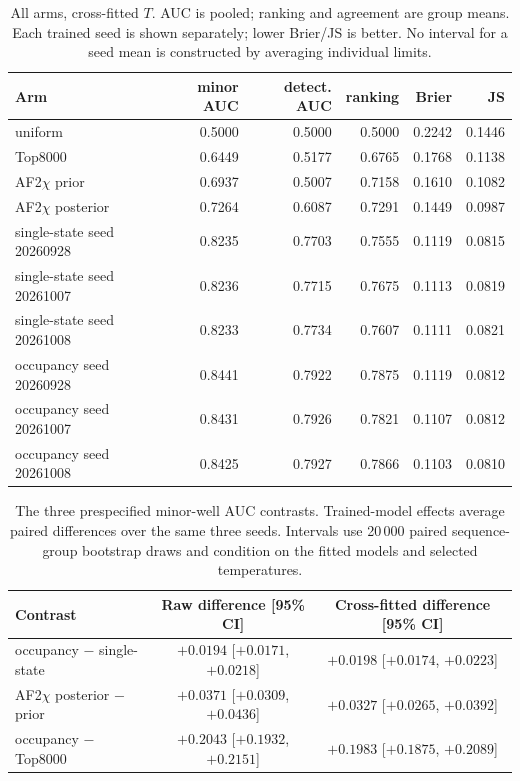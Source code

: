 \documentclass[10pt,a4paper]{article}
\begin{document}
\begin{table}[!htbp]
\centering
\caption{All arms, cross-fitted $T$. AUC is pooled; ranking and agreement are group means. Each trained seed is shown separately; lower Brier/JS is better. No interval for a seed mean is constructed by averaging individual limits.}
\label{tab:afarmscal}
\small\setlength{\tabcolsep}{4pt}
\begin{tabular}{@{}lrrrrr@{}}
\toprule
Arm & minor AUC & detect. AUC & ranking & Brier & JS \\
\midrule
uniform & 0.5000 & 0.5000 & 0.5000 & 0.2242 & 0.1446 \\
Top8000 & 0.6449 & 0.5177 & 0.6765 & 0.1768 & 0.1138 \\
AF2$\chi$ prior & 0.6937 & 0.5007 & 0.7158 & 0.1610 & 0.1082 \\
AF2$\chi$ posterior & 0.7264 & 0.6087 & 0.7291 & 0.1449 & 0.0987 \\
single-state seed 20260928 & 0.8235 & 0.7703 & 0.7555 & 0.1119 & 0.0815 \\
single-state seed 20261007 & 0.8236 & 0.7715 & 0.7675 & 0.1113 & 0.0819 \\
single-state seed 20261008 & 0.8233 & 0.7734 & 0.7607 & 0.1111 & 0.0821 \\
occupancy seed 20260928 & 0.8441 & 0.7922 & 0.7875 & 0.1119 & 0.0812 \\
occupancy seed 20261007 & 0.8431 & 0.7926 & 0.7821 & 0.1107 & 0.0812 \\
occupancy seed 20261008 & 0.8425 & 0.7927 & 0.7866 & 0.1103 & 0.0810 \\
\bottomrule
\end{tabular}
\end{table}

\begin{table}[!htbp]
\centering
\caption{The three prespecified minor-well AUC contrasts. Trained-model effects average paired differences over the same three seeds. Intervals use 20\,000 paired sequence-group bootstrap draws and condition on the fitted models and selected temperatures.}
\label{tab:afprimary}
\small\setlength{\tabcolsep}{4pt}
\begin{tabular}{@{}lcc@{}}
\toprule
Contrast & Raw difference [95\% CI] & Cross-fitted difference [95\% CI] \\
\midrule
occupancy $-$ single-state & $+0.0194$ [$+0.0171$, $+0.0218$] & $+0.0198$ [$+0.0174$, $+0.0223$] \\
AF2$\chi$ posterior $-$ prior & $+0.0371$ [$+0.0309$, $+0.0436$] & $+0.0327$ [$+0.0265$, $+0.0392$] \\
occupancy $-$ Top8000 & $+0.2043$ [$+0.1932$, $+0.2151$] & $+0.1983$ [$+0.1875$, $+0.2089$] \\
\bottomrule
\end{tabular}
\end{table}
\end{document}
